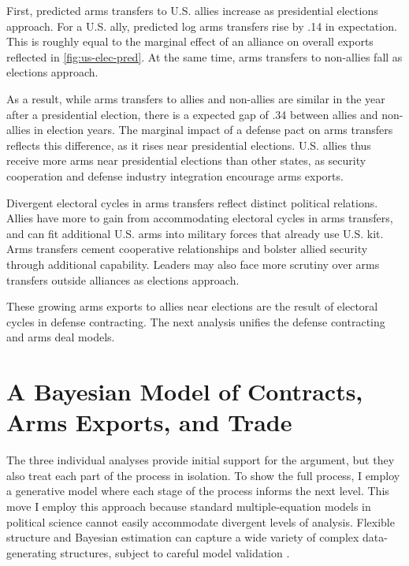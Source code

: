 \documentclass[12pt]{article}
\begin{document}
First, predicted arms transfers to U.S. allies increase as presidential elections approach.
For a U.S. ally, predicted log arms transfers rise by .14 in expectation. 
This is roughly equal to the marginal effect of an alliance on overall exports reflected in \autoref{fig:us-elec-pred}.
At the same time, arms transfers to non-allies fall as elections approach. 


As a result, while arms transfers to allies and non-allies are similar in the year after a presidential election, there is a expected gap of .34 between allies and non-allies in election years.
The marginal impact of a defense pact on arms transfers reflects this difference, as it rises near presidential elections.
U.S. allies thus receive more arms near presidential elections than other states, as security cooperation and defense industry integration encourage arms exports.


Divergent electoral cycles in arms transfers reflect distinct political relations.
Allies have more to gain from accommodating electoral cycles in arms transfers, and can fit additional U.S. arms into military forces that already use U.S. kit.
Arms transfers cement cooperative relationships and bolster allied security through additional capability.
Leaders may also face more scrutiny over arms transfers outside alliances as elections approach. 


These growing arms exports to allies near elections are the result of electoral cycles in defense contracting. 
The next analysis unifies the defense contracting and arms deal models. 




\section{A Bayesian Model of Contracts, Arms Exports, and Trade}


The three individual analyses provide initial support for the argument, but they also treat each part of the process in isolation. 
To show the full process, I employ a generative model where each stage of the process informs the next level.
This move 
I employ this approach because standard multiple-equation models in political science cannot easily accommodate divergent levels of analysis.
Flexible structure and Bayesian estimation can capture a wide variety of complex data-generating structures, subject to careful model validation \citep{Betancourt2021}. 
\end{document}
